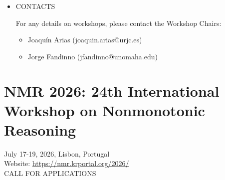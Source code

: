 \documentclass[prodmode,acmtecs]{acmsmall} %
\begin{document}
\begin{itemize}
\item  CONTACTS  
 
  For any details on workshops, please contact the Workshop Chairs: 
 
\begin{itemize}\item  Joaquín Arias (joaquin.arias@urjc.es)
\item  Jorge Fandinno (jfandinno@unomaha.edu)
\end{itemize} 
\end{itemize}\section{NMR 2026: 24th International Workshop on Nonmonotonic Reasoning}\label{NMR2026}  July 17-19, 2026, Lisbon, Portugal\\ 
  Website: \href{https://nmr.krportal.org/2026/}{https://nmr.krportal.org/2026/}\\ 
CALL FOR APPLICATIONS 
\end{document}
